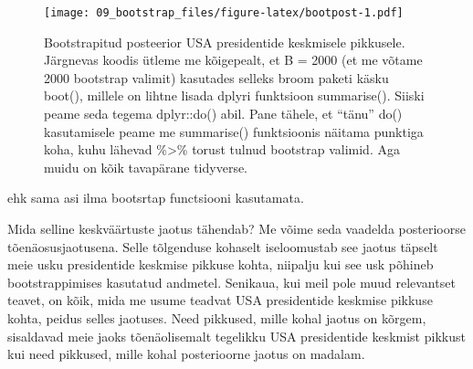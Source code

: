 \documentclass[]{book}
\newenvironment{Shaded}{\begin{snugshade}}{\end{snugshade}}
\newcommand{\CommentTok}[1]{\textcolor[rgb]{0.56,0.35,0.01}{\textit{#1}}}
\newcommand{\DataTypeTok}[1]{\textcolor[rgb]{0.13,0.29,0.53}{#1}}
\newcommand{\DecValTok}[1]{\textcolor[rgb]{0.00,0.00,0.81}{#1}}
\newcommand{\KeywordTok}[1]{\textcolor[rgb]{0.13,0.29,0.53}{\textbf{#1}}}
\newcommand{\NormalTok}[1]{#1}
\newcommand{\OperatorTok}[1]{\textcolor[rgb]{0.81,0.36,0.00}{\textbf{#1}}}
\newcommand{\OtherTok}[1]{\textcolor[rgb]{0.56,0.35,0.01}{#1}}
\newcommand{\StringTok}[1]{\textcolor[rgb]{0.31,0.60,0.02}{#1}}
\begin{document}
\begin{figure}
\centering
\texttt{[image: 09\_bootstrap\_files/figure-latex/bootpost-1.pdf]}
\caption{\label{fig:bootpost}Bootstrapitud posteerior USA presidentide keskmisele pikkusele. Järgnevas koodis ütleme me kõigepealt, et B = 2000 (et me võtame 2000 bootstrap valimit) kasutades selleks broom paketi käsku boot(), millele on lihtne lisada dplyri funktsioon summarise(). Siiski peame seda tegema dplyr::do() abil. Pane tähele, et ``tänu'' do() kasutamisele peame me summarise() funktsioonis näitama punktiga koha, kuhu lähevad \%\textgreater{}\% torust tulnud bootstrap valimid. Aga muidu on kõik tavapärane tidyverse.}
\end{figure}

ehk sama asi ilma bootsrtap functsiooni kasutamata.

\begin{Shaded}
\end{Shaded}

Mida selline keskväärtuste jaotus tähendab? Me võime seda vaadelda posterioorse tõenäosusjaotusena. Selle tõlgenduse kohaselt iseloomustab see jaotus täpselt meie usku presidentide keskmise pikkuse kohta, niipalju kui see usk põhineb bootstrappimises kasutatud andmetel. Senikaua, kui meil pole muud relevantset teavet, on kõik, mida me usume teadvat USA presidentide keskmise pikkuse kohta, peidus selles jaotuses. Need pikkused, mille kohal jaotus on kõrgem, sisaldavad meie jaoks tõenäolisemalt tegelikku USA presidentide keskmist pikkust kui need pikkused, mille kohal posterioorne jaotus on madalam.
\end{document}
